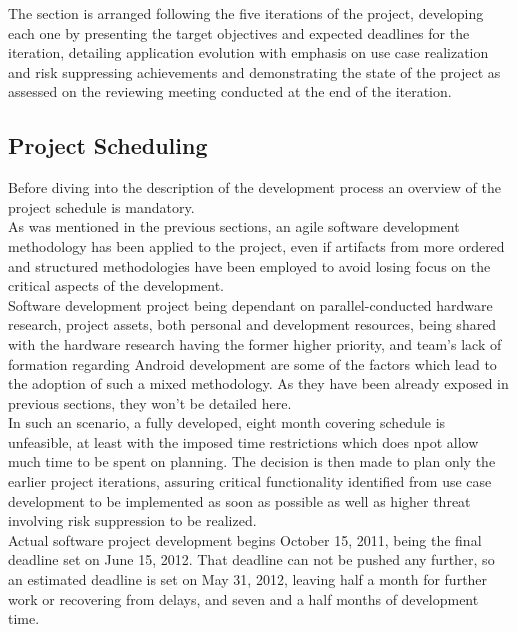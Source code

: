 		The section is arranged following the five iterations of the project, developing each one by presenting the target objectives and expected deadlines for the iteration, detailing application evolution with emphasis on use case realization and risk suppressing achievements and demonstrating the state of the project as assessed on the reviewing meeting conducted at the end of the iteration.

		\subsection{Project Scheduling}
			
			Before diving into the description of the development process an overview of the project schedule %
			is mandatory.\\

			As was mentioned in the previous sections, an agile software development methodology has been applied to the project, even if artifacts from more ordered and structured methodologies have been employed to avoid losing focus on the critical aspects of the development.\\
	
			Software development project being dependant on parallel-conducted hardware research, project assets, both personal and development resources, being shared with the hardware research having the former higher priority, and team's lack of formation regarding Android development are some of the factors which lead to the adoption of such a mixed methodology. As they have been already exposed in previous sections, they won't be detailed here.\\ %

			In such an scenario, a fully developed, eight month covering schedule is unfeasible, at least with the imposed time restrictions which does npot allow much time to be spent on planning. The decision is then made to plan only the earlier project iterations, assuring critical functionality identified from use case development to be implemented as soon as possible as well as higher threat involving risk suppression to be realized.\\

			Actual software project development begins October 15, 2011, being the final deadline set on June 15, 2012. That deadline can not be pushed any further, so an estimated deadline is set on May 31, 2012, leaving half a month for further work or recovering from delays, and seven and a half months of development time.\\
		
